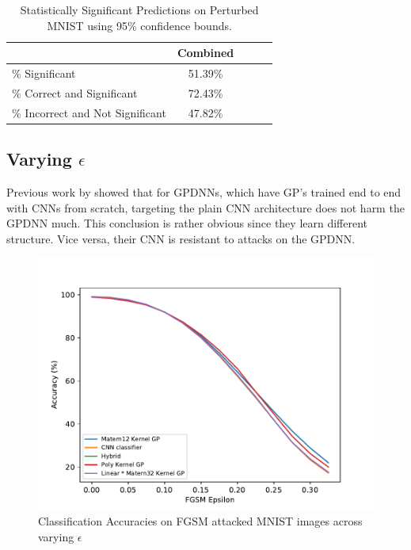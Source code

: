 \documentclass{article}
\begin{document}
\begin{table}[h]
\caption{Statistically Significant Predictions on Perturbed MNIST using 95\% confidence bounds.}
\vskip 0.15in
\begin{center}
\begin{small}
\begin{sc}
\begin{tabular}{lcccr}
\toprule
							&  Combined  	\\
\midrule
\% Significant				& 51.39\%		\\
\% Correct and Significant  & 72.43\%  		\\
\% Incorrect and Not Significant & 47.82\% \\
\bottomrule
\end{tabular}
\end{sc}
\end{small}
\end{center}
\vskip -0.1in
\label{tab:adv_statsig}
\end{table}



\subsection{Varying $\epsilon$}
Previous work by \citet{Bradshaw2017} showed that for GPDNNs, which have GP's trained end to end with CNNs from scratch, targeting the plain CNN architecture does not harm the GPDNN much. This conclusion is rather obvious since they learn different structure. Vice versa, their CNN is resistant to attacks on the GPDNN.

\begin{figure}[h!]
\centering
\includegraphics[width=\hsize]{./figures/adversarial/epsilons.pdf}
\caption{Classification Accuracies on FGSM attacked MNIST images across varying $\epsilon$}
\label{fig:adv:epsilons}
\end{figure}
\end{document}

